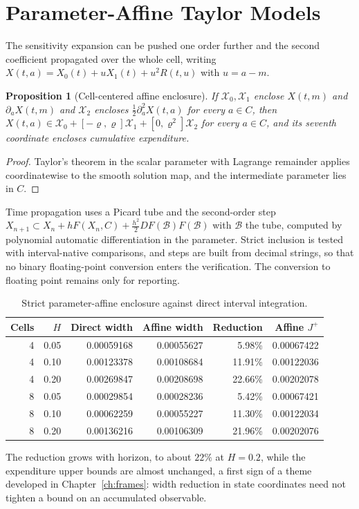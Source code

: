 \documentclass[11pt,notitlepage]{report}
\newtheorem{proposition}[theorem]{Proposition}
\theoremstyle{definition}
\theoremstyle{remark}
\begin{document}
\section{Parameter-Affine Taylor Models}
The sensitivity expansion can be pushed one order further and the second coefficient propagated over the whole cell, writing $X(t,a)=X_0(t)+uX_1(t)+u^2R(t,u)$ with $u=a-m$.
\begin{proposition}[Cell-centered affine enclosure]\label{prop:affinecell}
If $\mathcal X_0,\mathcal X_1$ enclose $X(t,m)$ and $\partial_aX(t,m)$ and $\mathcal X_2$ encloses $\tfrac12\partial_a^2X(t,a)$ for every $a\in C$, then $X(t,a)\in\mathcal X_0+[-\varrho,\varrho]\mathcal X_1+[0,\varrho^2]\mathcal X_2$ for every $a\in C$, and its seventh coordinate encloses cumulative expenditure.
\end{proposition}
\begin{proof}
Taylor's theorem in the scalar parameter with Lagrange remainder applies coordinatewise to the smooth solution map, and the intermediate parameter lies in $C$.
\end{proof}
Time propagation uses a Picard tube and the second-order step $X_{n+1}\subset X_n+hF(X_n,C)+\tfrac{h^2}2DF(\mathcal B)F(\mathcal B)$ with $\mathcal B$ the tube, computed by polynomial automatic differentiation in the parameter. Strict inclusion is tested with interval-native comparisons, and steps are built from decimal strings, so that no binary floating-point conversion enters the verification. The conversion to floating point remains only for reporting.
\begin{table}[ht]\centering\small
\caption{Strict parameter-affine enclosure against direct interval integration.}
\begin{tabular}{rrrrrr}\toprule
Cells&$H$&Direct width&Affine width&Reduction&Affine $J^+$\\\midrule
4&0.05&0.00059168&0.00055627&5.98\%&0.00067422\\
4&0.10&0.00123378&0.00108684&11.91\%&0.00122036\\
4&0.20&0.00269847&0.00208698&22.66\%&0.00202078\\
8&0.05&0.00029854&0.00028236&5.42\%&0.00067421\\
8&0.10&0.00062259&0.00055227&11.30\%&0.00122034\\
8&0.20&0.00136216&0.00106309&21.96\%&0.00202076\\\bottomrule
\end{tabular}
\end{table}
The reduction grows with horizon, to about $22\%$ at $H=0.2$, while the expenditure upper bounds are almost unchanged, a first sign of a theme developed in Chapter~\ref{ch:frames}: width reduction in state coordinates need not tighten a bound on an accumulated observable.
\end{document}
